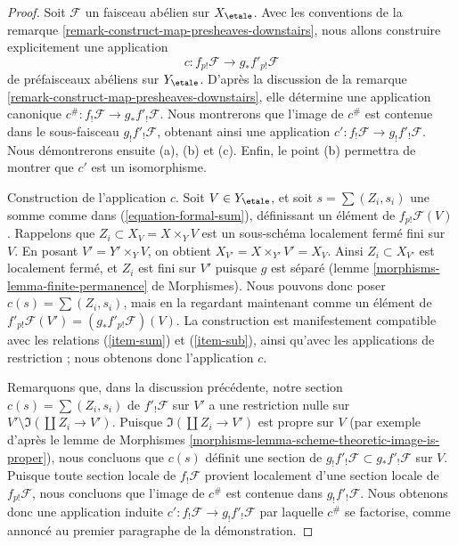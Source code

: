 \begin{proof}
Soit $\mathcal{F}$ un faisceau abélien sur $X_\etale$. Avec les conventions de la
remarque \ref{remark-construct-map-presheaves-downstairs}, nous allons
construire explicitement une application
$$
c : f_{p!}\mathcal{F} \longrightarrow g_*f'_{p!}\mathcal{F}
$$
de préfaisceaux abéliens sur $Y_\etale$. D'après la discussion de la
remarque \ref{remark-construct-map-presheaves-downstairs},
elle détermine une application canonique
$c^\# : f_!\mathcal{F} \to g_*f'_!\mathcal{F}$.
Nous montrerons que l'image de $c^\#$ est contenue dans le sous-faisceau
$g_!f'_!\mathcal{F}$, obtenant ainsi une application
$c' : f_!\mathcal{F} \to g_!f'_!\mathcal{F}$. Nous démontrerons ensuite
(a), (b) et (c). Enfin, le point (b)
permettra de montrer que $c'$ est un isomorphisme.

\medskip\noindent
Construction de l'application $c$. Soit $V \in Y_\etale$, et
soit $s = \sum (Z_i, s_i)$ une somme comme dans (\ref{equation-formal-sum}),
définissant un élément de $f_{p!}\mathcal{F}(V)$.
Rappelons que $Z_i \subset X_V = X \times_Y V$
est un sous-schéma localement fermé fini sur $V$.
En posant $V' = Y' \times_Y V$, on obtient $X_{V'} = X \times_{Y'} V' = X_V$.
Ainsi $Z_i \subset X_{V'}$ est localement fermé, et
$Z_i$ est fini sur $V'$ puisque $g$ est séparé
(lemme \ref{morphisms-lemma-finite-permanence} de Morphismes).
Nous pouvons donc poser $c(s) = \sum (Z_i, s_i)$, mais en la regardant maintenant
comme un élément de $f'_{p!}\mathcal{F}(V') = (g_*f'_{p!}\mathcal{F})(V)$.
La construction est manifestement compatible avec les relations
(\ref{item-sum}) et (\ref{item-sub}),
ainsi qu'avec les applications de restriction ; nous obtenons donc l'application $c$.

\medskip\noindent
Remarquons que, dans la discussion précédente, notre section $c(s) = \sum (Z_i, s_i)$ de
$f'_!\mathcal{F}$ sur $V'$ a une restriction nulle sur
$V' \setminus \Im(\coprod Z_i \to V')$. Puisque $\Im(\coprod Z_i \to V')$
est propre sur $V$ (par exemple d'après le lemme de Morphismes
\ref{morphisms-lemma-scheme-theoretic-image-is-proper}),
nous concluons que $c(s)$ définit une section de
$g_!f'_!\mathcal{F} \subset g_*f'_!\mathcal{F}$ sur $V$.
Puisque toute section locale de $f_!\mathcal{F}$ provient localement d'une
section locale de $f_{p!}\mathcal{F}$, nous concluons que l'image
de $c^\#$ est contenue dans $g_!f'_!\mathcal{F}$.
Nous obtenons donc une application induite $c' : f_!\mathcal{F} \to g_!f'_!\mathcal{F}$
par laquelle $c^\#$ se factorise, comme annoncé au premier paragraphe de la démonstration.


\end{proof}
